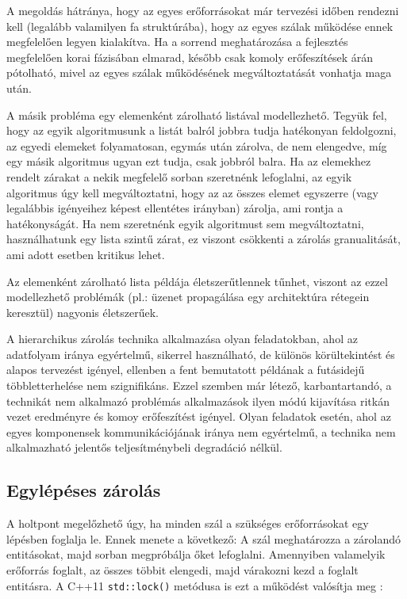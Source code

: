     A megoldás hátránya, hogy az egyes erőforrásokat már tervezési időben rendezni kell (legalább valamilyen fa struktúrába), hogy az egyes szálak működése ennek megfelelően legyen kialakítva. Ha a sorrend meghatározása a fejlesztés megfelelően korai fázisában elmarad, később csak komoly erőfeszítések árán pótolható, mivel az egyes szálak működésének megváltoztatását vonhatja maga után. 
    
    A másik probléma egy elemenként zárolható listával modellezhető. Tegyük fel, hogy az egyik algoritmusunk a listát balról jobbra tudja hatékonyan feldolgozni, az egyedi elemeket folyamatosan, egymás után zárolva, de nem elengedve, míg egy másik algoritmus ugyan ezt tudja, csak jobbról balra. Ha az elemekhez rendelt zárakat a nekik megfelelő sorban szeretnénk lefoglalni, az egyik algoritmus úgy kell megváltoztatni, hogy az az összes elemet egyszerre (vagy legalábbis igényeihez képest ellentétes irányban) zárolja, ami rontja a hatékonyságát. Ha nem szeretnénk egyik algoritmust sem megváltoztatni, használhatunk egy lista szintű zárat, ez viszont csökkenti a zárolás granualitását, ami adott esetben kritikus lehet.
    
    Az elemenként zárolható lista példája életszerűtlennek tűnhet, viszont az ezzel modellezhető problémák (pl.: üzenet propagálása egy architektúra rétegein keresztül) nagyonis életszerűek.
    
    A hierarchikus zárolás technika alkalmazása olyan feladatokban, ahol az adatfolyam iránya egyértelmű, sikerrel használható, de különös körültekintést és alapos tervezést igényel, ellenben a fent bemutatott példának a futásidejű többletterhelése nem szignifikáns. Ezzel szemben már létező, karbantartandó, a technikát nem alkalmazó problémás alkalmazások ilyen módú kijavítása ritkán vezet eredményre és komoy erőfeszítést igényel. Olyan feladatok esetén, ahol az egyes komponensek kommunikációjának iránya nem egyértelmű, a technika nem alkalmazható jelentős teljesítménybeli degradáció nélkül.
    
    \subsection{Egylépéses zárolás}
    \label{seq:onsestep}
    
    A holtpont megelőzhető úgy, ha minden szál a szükséges erőforrásokat egy lépésben foglalja le. Ennek menete a következő: A szál meghatározza a zárolandó entitásokat, majd sorban megpróbálja őket lefoglalni. Amennyiben valamelyik erőforrás foglalt, az összes többit elengedi, majd várakozni kezd a foglalt entitásra. A C++11 \texttt{std::lock()} metódusa is ezt a működést valósítja meg \cite{C++11/lock}:
    
